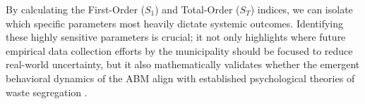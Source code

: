 By calculating the First-Order ($S_1$) and Total-Order ($S_T$) indices, we can isolate which specific parameters most heavily dictate systemic outcomes. Identifying these highly sensitive parameters is crucial; it not only highlights where future empirical data collection efforts by the municipality should be focused to reduce real-world uncertainty, but it also mathematically validates whether the emergent behavioral dynamics of the ABM align with established psychological theories of waste segregation \citep{Tian2024}.